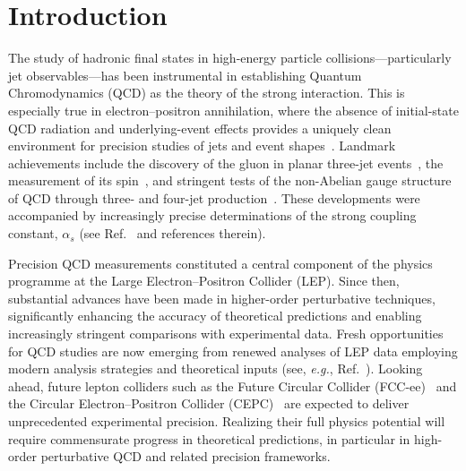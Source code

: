 \documentclass[10pt,aps,prl,superscriptaddress,twocolumn,preprintnumbers,nofootinbib]{revtex4-2}
\begin{document}
\maketitle

\section{Introduction}

The study of hadronic final states in high-energy particle collisions—particularly jet observables—has been instrumental in establishing Quantum Chromodynamics (QCD) as the theory of the strong interaction. This is especially true in electron–positron annihilation, where the absence of initial-state QCD radiation and underlying-event effects provides a uniquely clean environment for precision studies of jets and event shapes~\cite{Stagnitto:2025air}. Landmark achievements include the discovery of the gluon in planar three-jet events~\cite{TASSO:1979zyf}, the measurement of its spin~\cite{L3:1991jmb}, and stringent tests of the non-Abelian gauge structure of QCD through three- and four-jet production~\cite{L3:1990jlf,ALEPH:1992fwh,ALEPH:1997mcm,Kluth:2000km,OPAL:2001klt,ALEPH:2002kjp,DELPHI:2004als,Kluth:2006bw}. These developments were accompanied by increasingly precise determinations of the strong coupling constant, $\alpha_s$ (see Ref.~\cite{Huston:2023ofk} and references therein).

Precision QCD measurements constituted a central component of the physics programme at the Large Electron–Positron Collider (LEP). Since then, substantial advances have been made in higher-order perturbative techniques, significantly enhancing the accuracy of theoretical predictions and enabling increasingly stringent comparisons with experimental data. Fresh opportunities for QCD studies are now emerging from renewed analyses of LEP data employing modern analysis strategies and theoretical inputs (see, \textit{e.g.}, Ref.~\cite{Electron-PositronAlliance:2019cpi}). Looking ahead, future lepton colliders such as the Future Circular Collider (FCC-ee)~\cite{FCC:2018byv,FCC:2018evy,FCC:2025lpp} and the Circular Electron–Positron Collider (CEPC)~\cite{An:2018dwb,CEPCPhysicsStudyGroup:2022uwl,Ai:2024nmn} are expected to deliver unprecedented experimental precision. Realizing their full physics potential will require commensurate progress in theoretical predictions, in particular in high-order perturbative QCD and related precision frameworks.
\end{document}
